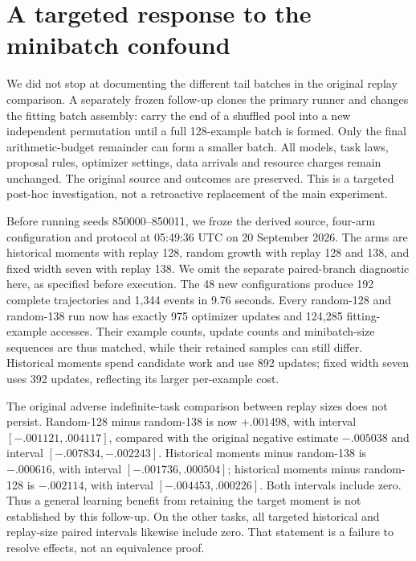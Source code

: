 \section{A targeted response to the minibatch confound}
\label{sec:fullbatch}

We did not stop at documenting the different tail batches in the original
replay comparison. A separately frozen follow-up clones the primary runner
and changes the fitting batch assembly: carry the end of a shuffled pool
into a new independent permutation until a full 128-example batch is formed.
Only the final arithmetic-budget remainder can form a smaller batch. All
models, task laws, proposal rules, optimizer settings, data arrivals and
resource charges remain unchanged. The original source and outcomes are
preserved. This is a targeted post-hoc investigation, not a retroactive
replacement of the main experiment.

Before running seeds 850000--850011, we froze the derived source, four-arm
configuration and protocol at 05:49:36 UTC on 20 September 2026. The arms are
historical moments with replay 128, random growth with replay 128 and 138,
and fixed width seven with replay 138. We omit the separate paired-branch
diagnostic here, as specified before execution. The 48 new configurations
produce 192 complete trajectories and 1,344 events in 9.76 seconds. Every
random-128 and random-138 run now has exactly 975 optimizer updates and
124,285 fitting-example accesses. Their example counts, update counts and
minibatch-size sequences are thus matched, while their retained samples can
still differ. Historical moments spend candidate work and use 892 updates;
fixed width seven uses 392 updates, reflecting its larger per-example cost.

\begin{table}[tb]
\centering\small

\caption{New-seed, full-minibatch follow-up. These are separate observations,
not overwritten entries in Table~\ref{tab:quadratic-results}. All means are
final population MSE, with the same nonlinear Monte Carlo evaluation rule.}
\label{tab:fullbatch}
\end{table}

The original adverse indefinite-task comparison between replay sizes does
not persist. Random-128 minus random-138 is now $+.001498$, with interval
$[-.001121,.004117]$, compared with the original negative estimate
$-.005038$ and interval $[-.007834,-.002243]$. Historical moments minus
random-138 is $-.000616$, with interval $[-.001736,.000504]$; historical
moments minus random-128 is $-.002114$, with interval
$[-.004453,.000226]$. Both intervals include zero.
Thus a general learning benefit from retaining the target moment is not
established by this follow-up. On the other tasks, all targeted historical
and replay-size paired intervals likewise include zero. That statement is a
failure to resolve effects, not an equivalence proof.

